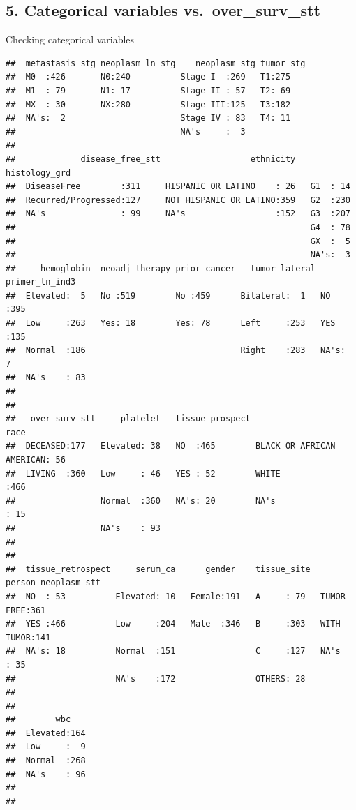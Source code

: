 \documentclass[]{article}
\begin{document}
\subsection{5. Categorical variables
vs.~over\_surv\_stt}\label{categorical-variables-vs.over_surv_stt}

Checking categorical variables

\begin{verbatim}
##  metastasis_stg neoplasm_ln_stg    neoplasm_stg tumor_stg
##  M0  :426       N0:240          Stage I  :269   T1:275   
##  M1  : 79       N1: 17          Stage II : 57   T2: 69   
##  MX  : 30       NX:280          Stage III:125   T3:182   
##  NA's:  2                       Stage IV : 83   T4: 11   
##                                 NA's     :  3            
##                                                          
##             disease_free_stt                  ethnicity   histology_grd
##  DiseaseFree        :311     HISPANIC OR LATINO    : 26   G1  : 14     
##  Recurred/Progressed:127     NOT HISPANIC OR LATINO:359   G2  :230     
##  NA's               : 99     NA's                  :152   G3  :207     
##                                                           G4  : 78     
##                                                           GX  :  5     
##                                                           NA's:  3     
##     hemoglobin  neoadj_therapy prior_cancer   tumor_lateral primer_ln_ind3
##  Elevated:  5   No :519        No :459      Bilateral:  1   NO  :395      
##  Low     :263   Yes: 18        Yes: 78      Left     :253   YES :135      
##  Normal  :186                               Right    :283   NA's:  7      
##  NA's    : 83                                                             
##                                                                           
##                                                                           
##   over_surv_stt     platelet   tissue_prospect                        race    
##  DECEASED:177   Elevated: 38   NO  :465        BLACK OR AFRICAN AMERICAN: 56  
##  LIVING  :360   Low     : 46   YES : 52        WHITE                    :466  
##                 Normal  :360   NA's: 20        NA's                     : 15  
##                 NA's    : 93                                                  
##                                                                               
##                                                                               
##  tissue_retrospect     serum_ca      gender    tissue_site  person_neoplasm_stt
##  NO  : 53          Elevated: 10   Female:191   A     : 79   TUMOR FREE:361     
##  YES :466          Low     :204   Male  :346   B     :303   WITH TUMOR:141     
##  NA's: 18          Normal  :151                C     :127   NA's      : 35     
##                    NA's    :172                OTHERS: 28                      
##                                                                                
##                                                                                
##        wbc     
##  Elevated:164  
##  Low     :  9  
##  Normal  :268  
##  NA's    : 96  
##                
## 
\end{verbatim}
\end{document}
